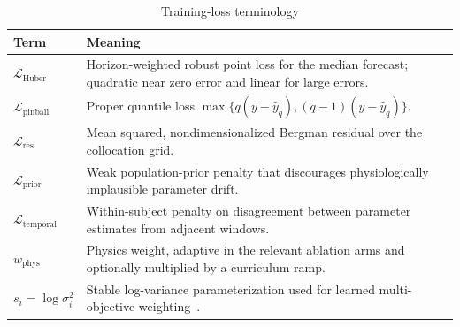 \documentclass[journal]{IEEEtran}
\begin{document}
\begin{table}[t]
\centering
\caption{Training-loss terminology}
\label{tab:loss}
\footnotesize
\begin{tabular}{lp{13cm}}
\toprule
Term & Meaning \\
\midrule
$\mathcal{L}_{\text{Huber}}$ & Horizon-weighted robust point loss for the median forecast; quadratic near zero error and linear for large errors. \\
$\mathcal{L}_{\text{pinball}}$ & Proper quantile loss $\max\{q(y-\hat{y}_q), (q-1)(y-\hat{y}_q)\}$. \\
$\mathcal{L}_{\text{res}}$ & Mean squared, nondimensionalized Bergman residual over the collocation grid. \\
$\mathcal{L}_{\text{prior}}$ & Weak population-prior penalty that discourages physiologically implausible parameter drift. \\
$\mathcal{L}_{\text{temporal}}$ & Within-subject penalty on disagreement between parameter estimates from adjacent windows. \\
$w_{\text{phys}}$ & Physics weight, adaptive in the relevant ablation arms and optionally multiplied by a curriculum ramp. \\
$s_i = \log\sigma_i^2$ & Stable log-variance parameterization used for learned multi-objective weighting~\cite{ref42}. \\
\bottomrule
\end{tabular}
\end{table}
\end{document}
